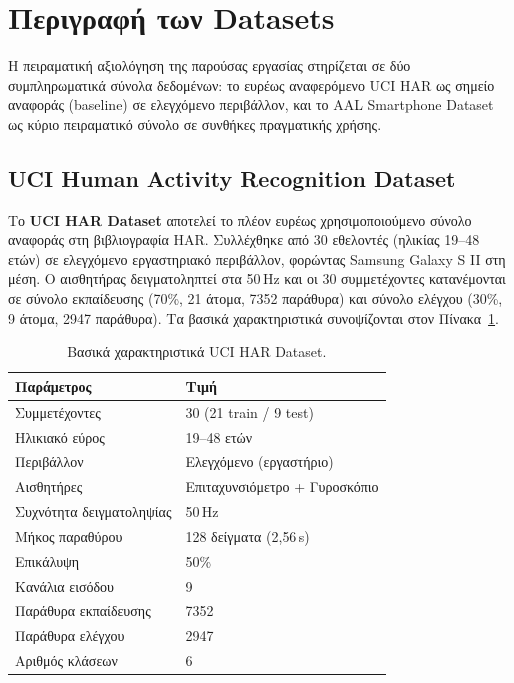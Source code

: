 
\section{Περιγραφή των Datasets}
\label{sec:datasets}

Η πειραματική αξιολόγηση της παρούσας εργασίας στηρίζεται σε δύο
συμπληρωματικά σύνολα δεδομένων: το ευρέως αναφερόμενο UCI HAR
ως σημείο αναφοράς (baseline) σε ελεγχόμενο περιβάλλον, και το
AAL Smartphone Dataset ως κύριο πειραματικό σύνολο σε συνθήκες
πραγματικής χρήσης.

\subsection{UCI Human Activity Recognition Dataset}
\label{subsec:uci_har}

Το \textbf{UCI HAR Dataset} \cite{Anguita2013} αποτελεί το πλέον
ευρέως χρησιμοποιούμενο σύνολο αναφοράς στη βιβλιογραφία HAR.
Συλλέχθηκε από 30 εθελοντές (ηλικίας 19–48 ετών) σε ελεγχόμενο
εργαστηριακό περιβάλλον, φορώντας Samsung Galaxy S II στη μέση.
Ο αισθητήρας δειγματοληπτεί στα 50\,Hz και οι 30 συμμετέχοντες
κατανέμονται σε σύνολο εκπαίδευσης (70\%, 21 άτομα, 7352 παράθυρα)
και σύνολο ελέγχου (30\%, 9 άτομα, 2947 παράθυρα). Τα βασικά
χαρακτηριστικά συνοψίζονται στον Πίνακα~\ref{tab:uci_har}.

\begin{table}[H]
    \centering
    \caption{Βασικά χαρακτηριστικά UCI HAR Dataset.}
    \label{tab:uci_har}
    \begin{tabular}{ll}
        \toprule
        \textbf{Παράμετρος} & \textbf{Τιμή} \\
        \midrule
        Συμμετέχοντες          & 30 (21 train / 9 test) \\
        Ηλικιακό εύρος         & 19–48 ετών \\
        Περιβάλλον             & Ελεγχόμενο (εργαστήριο) \\
        Αισθητήρες             & Επιταχυνσιόμετρο + Γυροσκόπιο \\
        Συχνότητα δειγματοληψίας & 50\,Hz \\
        Μήκος παραθύρου        & 128 δείγματα (2{,}56\,s) \\
        Επικάλυψη              & 50\% \\
        Κανάλια εισόδου        & 9 \\
        Παράθυρα εκπαίδευσης   & 7352 \\
        Παράθυρα ελέγχου       & 2947 \\
        Αριθμός κλάσεων        & 6 \\
        \bottomrule
    \end{tabular}
\end{table}

